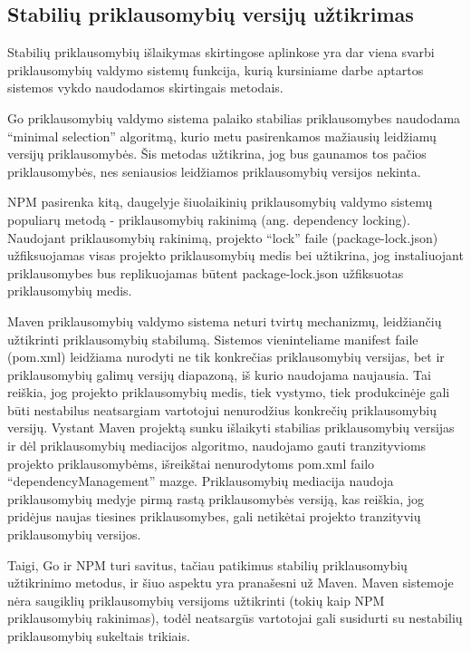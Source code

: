 \subsection{Stabilių priklausomybių versijų užtikrimas}

Stabilių priklausomybių išlaikymas skirtingose aplinkose yra dar viena svarbi priklausomybių valdymo sistemų
funkcija, kurią kursiniame darbe aptartos sistemos vykdo naudodamos skirtingais metodais.

Go priklausomybių valdymo sistema palaiko stabilias priklausomybes naudodama \enquote{minimal selection} algoritmą,
kurio metu pasirenkamos mažiausių leidžiamų versijų priklausomybės. Šis metodas užtikrina, jog bus gaunamos tos
pačios priklausomybės, nes seniausios leidžiamos priklausomybių versijos nekinta.

NPM pasirenka kitą, daugelyje šiuolaikinių priklausomybių valdymo sistemų populiarų metodą - priklausomybių
rakinimą (ang. dependency locking). Naudojant priklausomybių rakinimą, projekto “lock” faile (package-lock.json) užfiksuojamas
visas projekto priklausomybių medis bei užtikrina, jog instaliuojant priklausomybes bus replikuojamas būtent package-lock.json
užfiksuotas priklausomybių medis.

Maven priklausomybių valdymo sistema neturi tvirtų mechanizmų, leidžiančių užtikrinti priklausomybių stabilumą.
Sistemos vieninteliame manifest faile (pom.xml) leidžiama nurodyti ne tik konkrečias priklausomybių versijas, bet ir
priklausomybių galimų versijų diapazoną, iš kurio naudojama naujausia. Tai reiškia, jog projekto priklausomybių medis,
tiek vystymo, tiek produkcinėje gali būti nestabilus neatsargiam vartotojui nenurodžius konkrečių priklausomybių versijų. Vystant
Maven projektą sunku išlaikyti stabilias priklausomybių versijas ir dėl priklausomybių mediacijos algoritmo, naudojamo gauti
tranzityvioms projekto priklausomybėms, išreikštai nenurodytoms pom.xml failo \enquote{dependencyManagement} mazge.
Priklausomybių mediacija naudoja priklausomybių medyje pirmą rastą priklausomybės versiją, kas reiškia,
jog pridėjus naujas tiesines priklausomybes, gali netikėtai projekto tranzityvių priklausomybių versijos.

Taigi, Go ir NPM turi savitus, tačiau patikimus stabilių priklausomybių užtikrinimo metodus, ir šiuo aspektu yra pranašesni
už Maven. Maven sistemoje nėra saugiklių priklausomybių versijoms užtikrinti (tokių kaip NPM priklausomybių rakinimas), todėl
neatsargūs vartotojai gali susidurti su nestabilių priklausomybių sukeltais trikiais.
